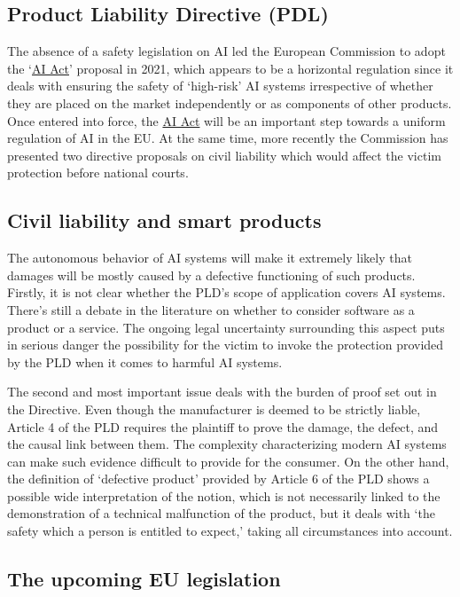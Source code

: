 \subsection{Product Liability Directive (PDL)}

The absence of a safety legislation on AI led the European Commission to adopt the ‘\hyperref[sec:AIAct]{AI Act}’ proposal in 2021, which appears to be a horizontal regulation since it deals with ensuring the safety of ‘high-risk’ AI systems irrespective of whether they are placed on the market independently or as components of other products. Once entered into force, the \hyperref[sec:AIAct]{AI Act} will be an important step towards a uniform regulation of AI in the EU. At the same time, more recently the Commission has presented two directive proposals on civil liability which would affect the victim protection before national courts.

\subsection{Civil liability and smart products}

The autonomous behavior of AI systems will make it extremely likely that damages will be mostly caused by a defective functioning of such products. Firstly, it is not clear whether the PLD’s scope of application covers AI systems. There's still a debate in the literature on whether to consider software as a product or a service. The ongoing legal uncertainty surrounding this aspect puts in serious danger the possibility for the victim to invoke the protection provided by the PLD when it comes to harmful AI systems.

The second and most important issue deals with the burden of proof set out in the Directive. Even though the manufacturer is deemed to be strictly liable, Article 4 of the PLD requires the plaintiff to prove the damage, the defect, and the causal link between them. The complexity characterizing modern AI systems can make such evidence difficult to provide for the consumer. On the other hand, the definition of ‘defective product’ provided by Article 6 of the PLD shows a possible wide interpretation of the notion, which is not necessarily linked to the demonstration of a technical malfunction of the product, but it deals with ‘the safety which a person is entitled to expect,’ taking all circumstances into account.

\subsection{The upcoming EU legislation}

